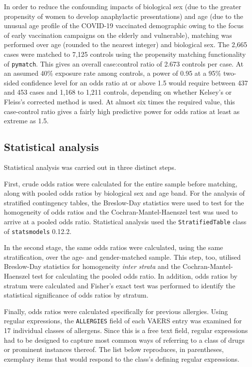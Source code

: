 \documentclass{article}
\begin{document}
In order to reduce the confounding impacts of biological sex (due to the greater propensity of women to develop anaphylactic presentations) and age (due to the unusual age profile of the COVID-19 vaccinated demographic owing to the focus of early vaccination campaigns on the elderly and vulnerable), matching was performed over age (rounded to the nearest integer) and biological sex.
The 2,665 cases were matched to 7,125 controls using the propensity matching functionality of \texttt{pymatch}.
This gives an overall case:control ratio of 2.673 controls per case.
At an assumed 40\% exposure rate among controls, a power of 0.95 at a 95\% two-sided confidence level for an odds ratio at or above 1.5 would require between 437 and 453 cases and 1,168 to 1,211 controls, depending on whether Kelsey's or Fleiss's corrected method is used.\cite{kelsey1996methods,fleiss2013statistical}
At almost six times the required value, this case-control ratio gives a fairly high predictive power for odds ratios at least as extreme as 1.5.

\subsection{Statistical analysis}

Statistical analysis was carried out in three distinct steps.

First, crude odds ratios were calculated for the entire sample before matching, along with pooled odds ratios by biological sex and age band.
For the analysis of stratified contingency tables, the Breslow-Day statistics were used to test for the homogeneity of odds ratios and the Cochran-Mantel-Haenszel test was used to arrive at a pooled odds ratio.
Statistical analysis used the \texttt{StratifiedTable} class of \texttt{statsmodels} 0.12.2.\cite{seabold2010statsmodels}

In the second stage, the same odds ratios were calculated, using the same stratification, over the age- and gender-matched sample.
This step, too, utilised Breslow-Day statistics for homogeneity \textit{inter strata} and the Cochran-Mantel-Haenszel test for calculating the pooled odds ratio.
In addition, odds ratios by stratum were calculated and Fisher's exact test was performed to identify the statistical significance of odds ratios by stratum.

Finally, odds ratios were calculated specifically for previous allergies.
Using regular expressions, the \texttt{ALLERGIES} field of each VAERS entry was examined for 17 individual classes of allergens.
Since this is a free text field, regular expressions had to be designed to capture most common ways of referring to a class of drugs or prominent instances thereof.
The list below reproduces, in parentheses, exemplary items that would respond to the class's defining regular expressions.
\end{document}
